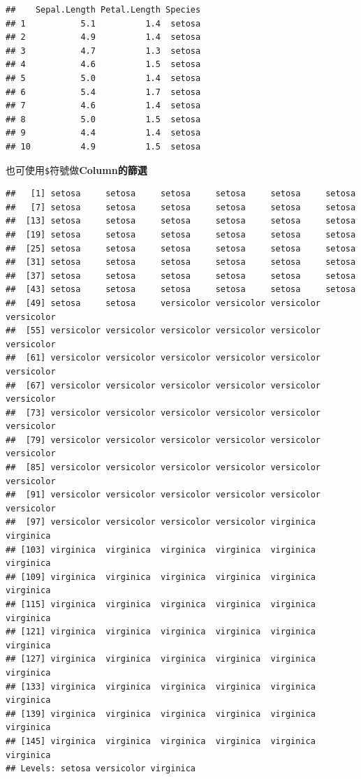 \documentclass[]{book}
\newenvironment{Shaded}{\begin{snugshade}}{\end{snugshade}}
\newcommand{\NormalTok}[1]{{#1}}
\theoremstyle{definition}
\theoremstyle{definition}
\theoremstyle{remark}
\begin{document}
\begin{verbatim}
##    Sepal.Length Petal.Length Species
## 1           5.1          1.4  setosa
## 2           4.9          1.4  setosa
## 3           4.7          1.3  setosa
## 4           4.6          1.5  setosa
## 5           5.0          1.4  setosa
## 6           5.4          1.7  setosa
## 7           4.6          1.4  setosa
## 8           5.0          1.5  setosa
## 9           4.4          1.4  setosa
## 10          4.9          1.5  setosa
\end{verbatim}

也可使用\texttt{\$}符號做\textbf{Column的篩選}

\begin{Shaded}
\end{Shaded}

\begin{verbatim}
##   [1] setosa     setosa     setosa     setosa     setosa     setosa    
##   [7] setosa     setosa     setosa     setosa     setosa     setosa    
##  [13] setosa     setosa     setosa     setosa     setosa     setosa    
##  [19] setosa     setosa     setosa     setosa     setosa     setosa    
##  [25] setosa     setosa     setosa     setosa     setosa     setosa    
##  [31] setosa     setosa     setosa     setosa     setosa     setosa    
##  [37] setosa     setosa     setosa     setosa     setosa     setosa    
##  [43] setosa     setosa     setosa     setosa     setosa     setosa    
##  [49] setosa     setosa     versicolor versicolor versicolor versicolor
##  [55] versicolor versicolor versicolor versicolor versicolor versicolor
##  [61] versicolor versicolor versicolor versicolor versicolor versicolor
##  [67] versicolor versicolor versicolor versicolor versicolor versicolor
##  [73] versicolor versicolor versicolor versicolor versicolor versicolor
##  [79] versicolor versicolor versicolor versicolor versicolor versicolor
##  [85] versicolor versicolor versicolor versicolor versicolor versicolor
##  [91] versicolor versicolor versicolor versicolor versicolor versicolor
##  [97] versicolor versicolor versicolor versicolor virginica  virginica 
## [103] virginica  virginica  virginica  virginica  virginica  virginica 
## [109] virginica  virginica  virginica  virginica  virginica  virginica 
## [115] virginica  virginica  virginica  virginica  virginica  virginica 
## [121] virginica  virginica  virginica  virginica  virginica  virginica 
## [127] virginica  virginica  virginica  virginica  virginica  virginica 
## [133] virginica  virginica  virginica  virginica  virginica  virginica 
## [139] virginica  virginica  virginica  virginica  virginica  virginica 
## [145] virginica  virginica  virginica  virginica  virginica  virginica 
## Levels: setosa versicolor virginica
\end{verbatim}
\end{document}
